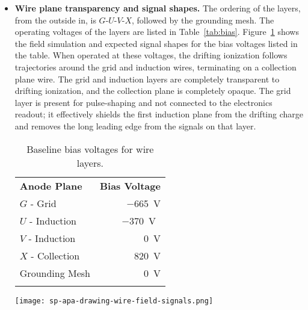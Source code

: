 \begin{itemize}
\item \textbf{Wire plane transparency and signal shapes.}  The ordering of the layers, from the outside in, is $G$-$U$-$V$-$X$, followed by the grounding mesh. The operating voltages of the  layers are listed in Table~\ref{tab:bias}.  Figure~\ref{fig:apa-fields} shows the field simulation and expected signal shapes for the bias voltages listed in the table.  When operated at these voltages, the drifting ionization follows trajectories around the grid and induction wires, terminating on a collection plane wire. The grid and induction layers are completely transparent to drifting ionization, and the collection plane is completely opaque.  The grid layer is present for pulse-shaping and not connected to the electronics readout; it effectively shields the first induction plane from the drifting charge and removes the long leading edge from the signals on that layer. 


\begin{table}[ht]
\begin{minipage}[b]{0.46\linewidth}
\centering
\begin{tabular}{ l  r }
    \hline
   \rowcolor{dunesky} \textbf{Anode Plane} & \textbf{Bias Voltage} \\ \toprowrule
	$G$ - Grid & \SI{-665}{V} \\ \colhline
	$U$ - Induction & \SI{-370}{V{}} \\ \colhline
	$V$ - Induction & \SI{0}{V} \\ \colhline
	$X$ - Collection & \SI{820}{V} \\ \colhline
	Grounding Mesh & \SI{0}{V} \\ \colhline
    \end{tabular}
    \caption{Baseline bias voltages for  wire layers.}
    \label{tab:bias}
\end{minipage}\hfill
\begin{minipage}[t]{0.5\linewidth}
\centering
\texttt{[image: sp-apa-drawing-wire-field-signals.png]}
\label{fig:apa-fields}
\end{minipage}
\end{table}


\end{itemize}
